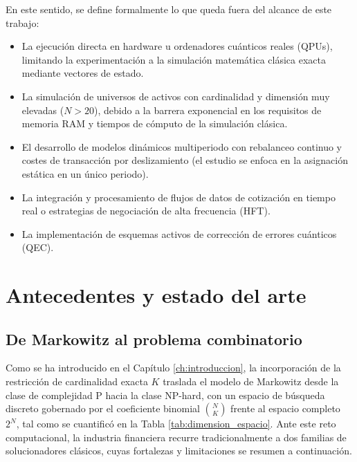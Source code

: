 En este sentido, se define formalmente lo que queda fuera del alcance de este trabajo:
\begin{itemize}
    \item La ejecución directa en hardware u ordenadores cuánticos reales (QPUs), 
          limitando la experimentación a la simulación matemática clásica exacta 
          mediante vectores de estado.
    \item La simulación de universos de activos con cardinalidad y dimensión muy 
          elevadas ($N > 20$), debido a la barrera exponencial en los requisitos de 
          memoria RAM y tiempos de cómputo de la simulación clásica.
    \item El desarrollo de modelos dinámicos multiperiodo con rebalanceo continuo y 
          costes de transacción por deslizamiento (el estudio se enfoca en la asignación 
          estática en un único periodo).
    \item La integración y procesamiento de flujos de datos de cotización en tiempo real 
          o estrategias de negociación de alta frecuencia (HFT).
    \item La implementación de esquemas activos de corrección de errores cuánticos (QEC).
\end{itemize}

\section{Antecedentes y estado del arte}
\label{sec:antecedentes_estado_arte}

\subsection{De Markowitz al problema combinatorio}
\label{subsec:markowitz_combinatorio}

Como se ha introducido en el Capítulo \ref{ch:introduccion}, la incorporación
de la restricción de cardinalidad exacta $K$ traslada el modelo de Markowitz
desde la clase de complejidad P hacia la clase NP-hard, con un espacio de
búsqueda discreto gobernado por el coeficiente binomial $\binom{N}{K}$ frente
al espacio completo $2^N$, tal como se cuantificó en la Tabla
\ref{tab:dimension_espacio}. Ante este reto computacional, la industria
financiera recurre tradicionalmente a dos familias de solucionadores
clásicos, cuyas fortalezas y limitaciones se resumen a continuación.

